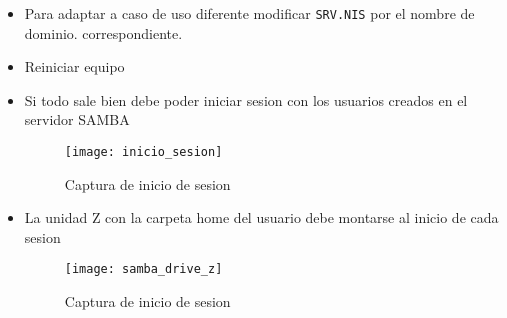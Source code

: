 \documentclass[../main.tex]{subfiles}
\begin{document}
\begin{itemize}
  \item Para adaptar a caso de uso diferente
        modificar \texttt{SRV.NIS} por el nombre de dominio.
        correspondiente.
  \item Reiniciar equipo
        \newpage{}
  \item Si todo sale bien debe poder iniciar sesion con los
        usuarios creados en el servidor SAMBA
        \begin{figure}[H]
          \centering
          \texttt{[image: inicio\_sesion]}
          \caption{Captura de inicio de sesion}\label{fig:inicio_sesion}
        \end{figure}
        \newpage{}
  \item La unidad Z con la carpeta home del usuario debe montarse al
        inicio de cada sesion
        \begin{figure}[H]
          \centering
          \texttt{[image: samba\_drive\_z]}
          \caption{Captura de inicio de sesion}\label{fig:samba_drive_z}
        \end{figure}

\end{itemize}
\end{document}
